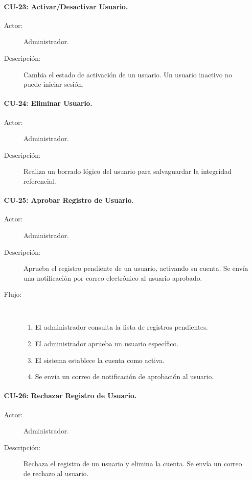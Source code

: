 \paragraph{CU-23: Activar/Desactivar Usuario.}
\begin{description}
    \item[Actor:] Administrador.
    \item[Descripción:] Cambia el estado de activación de un usuario. Un usuario inactivo no puede iniciar sesión.
\end{description}

\paragraph{CU-24: Eliminar Usuario.}
\begin{description}
    \item[Actor:] Administrador.
    \item[Descripción:] Realiza un borrado lógico del usuario para salvaguardar la integridad referencial.
\end{description}

\paragraph{CU-25: Aprobar Registro de Usuario.}
\begin{description}
    \item[Actor:] Administrador.
    \item[Descripción:] Aprueba el registro pendiente de un usuario, activando su cuenta. Se envía una notificación por correo electrónico al usuario aprobado.
    \item[Flujo:]~
    \begin{enumerate}
        \item El administrador consulta la lista de registros pendientes.
        \item El administrador aprueba un usuario específico.
        \item El sistema establece la cuenta como activa.
        \item Se envía un correo de notificación de aprobación al usuario.
    \end{enumerate}
\end{description}

\paragraph{CU-26: Rechazar Registro de Usuario.}
\begin{description}
    \item[Actor:] Administrador.
    \item[Descripción:] Rechaza el registro de un usuario y elimina la cuenta. Se envía un correo de rechazo al usuario.
\end{description}


